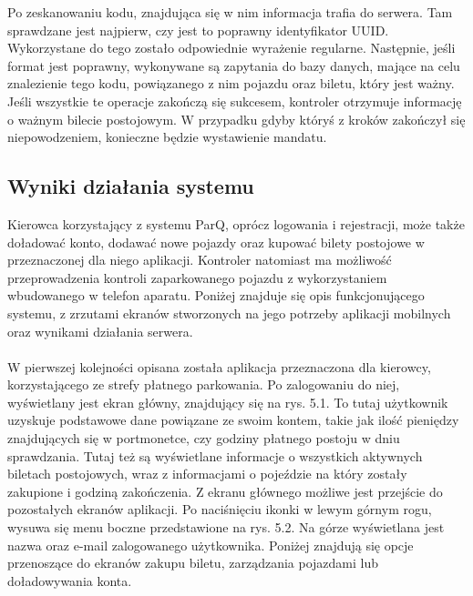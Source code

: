\begin{singlespace}
	\label{platnosc}
	\vspace{0.3cm}
	\inputminted[fontsize=\footnotesize, linenos=true]{java}{src/imp/start-scan.java}
\end{singlespace}

Po zeskanowaniu kodu, znajdująca się w nim informacja trafia do serwera. Tam sprawdzane jest najpierw, czy jest to poprawny identyfikator UUID. Wykorzystane do tego zostało odpowiednie wyrażenie regularne. Następnie, jeśli format jest poprawny, wykonywane są zapytania do bazy danych, mające na celu znalezienie tego kodu, powiązanego z nim pojazdu oraz biletu, który jest ważny. Jeśli wszystkie te operacje zakończą się sukcesem, kontroler otrzymuje informację o ważnym bilecie postojowym. W przypadku gdyby któryś z kroków zakończył się niepowodzeniem, konieczne będzie wystawienie mandatu. 

\newpage

\subsection{Wyniki działania systemu}

Kierowca korzystający z systemu ParQ, oprócz logowania i rejestracji, może także doładować konto, dodawać nowe pojazdy oraz kupować bilety postojowe w przeznaczonej dla niego aplikacji. Kontroler natomiast ma możliwość przeprowadzenia kontroli zaparkowanego pojazdu z wykorzystaniem wbudowanego w telefon aparatu. Poniżej znajduje się opis funkcjonującego systemu, z zrzutami ekranów stworzonych na jego potrzeby aplikacji mobilnych oraz wynikami działania serwera.
\\
\\
W pierwszej kolejności opisana została aplikacja przeznaczona dla kierowcy, korzystającego ze strefy płatnego parkowania. Po zalogowaniu do niej, wyświetlany jest ekran główny, znajdujący się na rys. 5.1. To tutaj użytkownik uzyskuje podstawowe dane powiązane ze swoim kontem, takie jak ilość pieniędzy znajdujących się w portmonetce, czy godziny płatnego postoju w dniu sprawdzania. Tutaj też są wyświetlane informacje o wszystkich aktywnych biletach postojowych, wraz z informacjami o pojeździe na który zostały zakupione i godziną zakończenia. Z ekranu głównego możliwe jest przejście do pozostałych ekranów aplikacji. Po naciśnięciu ikonki w lewym górnym rogu, wysuwa się menu boczne przedstawione na rys. 5.2. Na górze wyświetlana jest nazwa oraz e-mail zalogowanego użytkownika. Poniżej znajdują się opcje przenoszące do ekranów zakupu biletu, zarządzania pojazdami lub doładowywania konta.

